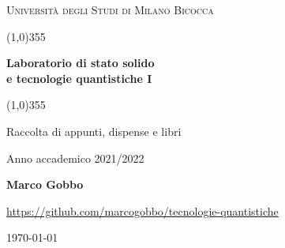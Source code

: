 \documentclass[a4paper, 12pt]{book}
\begin{document}
    \begin{titlepage}
        \begin{center}
            \vspace*{5cm}
            {\scshape\LARGE Università degli Studi di Milano Bicocca \par}
            \vspace{1.0cm}
            \line(1,0){355} \\
            {\huge\bfseries Laboratorio di stato solido \\ e tecnologie quantistiche I \par}
            \line(1,0){355} \\
 	        \vspace{0.5cm}
            {\Large Raccolta di appunti, dispense e libri \par}
            \vspace{1.0cm}
            {Anno accademico 2021/2022 \par}
            \vspace{0.5cm}
            {\bfseries Marco Gobbo \par}
            \vspace{0.5cm}
            {\url{https://github.com/marcogobbo/tecnologie-quantistiche} \par}
            \vspace*{\fill}
            {\large \today \par}
        \end{center}
    \end{titlepage}
\end{document}
